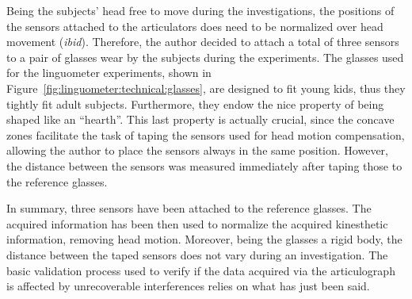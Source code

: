 Being the subjects' head free to move during the investigations, the positions
of the sensors attached to the articulators does need to be normalized over head
movement (\emph{ibid}).
Therefore, the author decided to attach a total of three sensors to a pair of 
glasses wear by the subjects during the experiments.
The glasses used for the linguometer experiments, shown in 
Figure~\ref{fig:linguometer:technical:glasses}, are designed to
fit young kids, thus they tightly fit adult subjects.
Furthermore, they endow the nice property of being shaped like an ``hearth''.
This last property is actually crucial, since the concave
zones facilitate the task of taping the sensors used for head motion
compensation, allowing the author to place the sensors always in the same
position.
However, the distance between the sensors was measured immediately after taping
those to the reference glasses.

In summary, three sensors have been attached to the reference
glasses. The acquired information has been then used to normalize the acquired
kinesthetic information, removing head motion. 
Moreover, being the glasses a rigid body, the distance between the taped 
sensors does not vary during an investigation.
The basic validation process used to verify if the data acquired via the 
articulograph is affected by unrecoverable interferences relies on what has just
been said.

